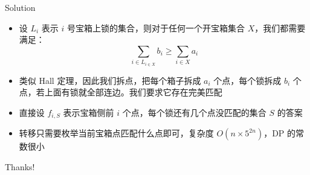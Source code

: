 ﻿\documentclass[aspectratio=169]{ctexbeamer}
\begin{document}
\begin{frame}{Solution}
    \begin{itemize}
        \item 设 $L_i$ 表示 $i$ 号宝箱上锁的集合，则对于任何一个开宝箱集合 $X$，我们都需要满足：
        $$
            \sum_{i\in L_{i\in X}} b_i \ge \sum_{i\in X} a_i
        $$
        \item 类似 Hall 定理，因此我们拆点，把每个箱子拆成 $a_i$ 个点，每个锁拆成 $b_i$ 个点，若上面有锁就全部连边。我们要求它存在完美匹配
        \item 直接设 $f_{i,S}$ 表示宝箱侧前 $i$ 个点，每个锁还有几个点没匹配的集合 $S$ 的答案
        \item 转移只需要枚举当前宝箱点匹配什么点即可，复杂度 $O(n\times 5^{2n})$，DP 的常数很小
    \end{itemize}
\end{frame}


\begin{frame}
    \begin{center}
        {\Huge\calligra Thanks!}
    \end{center}
\end{frame}
\end{document}

